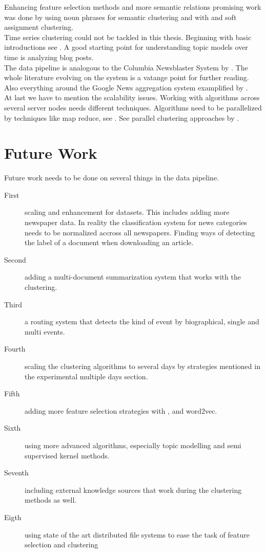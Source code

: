 Enhancing feature selection methods and more semantic relations promising work was done by \cite{NounPhraseSemanticClustering@2009@Zheng} using noun phrases for semantic clustering and 
\cite{WordNetAndFuzzyAssociation@2010@Chen} with \wordnet{} and soft assignment clustering.\\

Time series clustering could not be tackled in this thesis. Beginning with basic introductions see \cite{ClusteringTimesSeriesSurves2005, RecentTechniquesClusteringSurvey2012, IncrementalClustering2012}. A good starting point for understanding topic models over time is \cite{BlogTopicLDA2013} analyzing blog posts.\\

The data pipeline is analogous to the Columbia Newsblaster System by \cite{NewsBlaster2002}. The whole literature evolving on the system is a vatange point for further reading. Also everything around the Google News aggregation system examplified by \cite{GoogleNews2007}.\\

At last we have to mention the scalability issues. Working with algorithms across several server nodes needs different techniques. Algorithms need to be parallelized by techniques like map reduce, see \cite{MapReduce2008}. See parallel clustering approaches by \cite{ParallelClustering2009}.

\section{Future Work}

Future work needs to be done on several things in the data pipeline.

\begin{description}
  \item[First] scaling and enhancement for datasets. This includes adding more newspaper data. In reality the classification system for news categories needs to be normalized accross all newspapers. Finding ways of detecting the label of a document when downloading an article.
  \item[Second] adding a multi-document summarization system that works with the clustering.
  \item[Third] a routing system that detects the kind of event by biographical, single and multi events.
  \item[Fourth] scaling the clustering algorithms to several days by strategies mentioned in the experimental multiple days section.
  \item[Fifth] adding more feature selection strategies with \wordnet{}, \wiki{} and word2vec.
  \item[Sixth] using more advanced algorithms, especially topic modelling and semi supervised kernel methods.
  \item[Seventh] including external knowledge sources that work during the clustering methods as well.
  \item[Eigth] using state of the art distributed file systems to ease the task of feature selection and clustering
\end{description}

